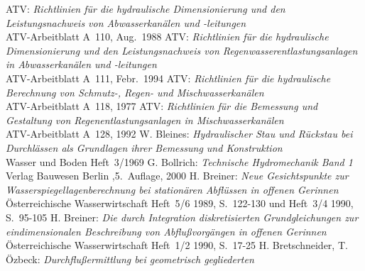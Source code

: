    \cleardoublepage
   \begin{thebibliography}{99}
                 ATV: \emph{Richtlinien f\"{u}r die hydraulische Dimensionierung und den Leistungsnachweis
                                 von  Abwasserkan\"{a}len und -leitungen}
                                 \\ ATV-Arbeitblatt A~110, Aug.~1988
                 ATV: \emph{Richtlinien f\"{u}r die hydraulische Dimensionierung und den Leistungsnachweis
                                 von Regenwasserentlastungsanlagen in Abwasserkan\"{a}len und -leitungen}
                                 \\ ATV-Arbeitblatt A~111, Febr.~1994
                 ATV: \emph{Richtlinien f\"{u}r die hydraulische Berechnung von Schmutz-, Regen- und
                                 Mischwasserkan\"{a}len}
                                 \\ ATV-Arbeitblatt A~118, 1977
                 ATV: \emph{Richtlinien f\"{u}r die Bemessung und Gestaltung von Regenentlastungsanlagen in
                                 Mischwasserkan\"{a}len}
                                 \\ ATV-Arbeitblatt A~128, 1992
                W. Bleines: \emph{Hydraulischer Stau und R\"{u}ckstau bei Durchl\"{a}ssen als Grundlagen ihrer
                                 Bemessung und Konstruktion}
                                 \\ Wasser und Boden Heft~3/1969
               G. Bollrich: \emph{Technische Hydromechanik Band 1}
                                 \\ Verlag Bauwesen Berlin ,5.~Auflage, 2000
               H. Breiner: \emph{Neue Gesichtspunkte zur Wasserspiegellagenberechnung bei station\"{a}ren
                                 Abfl\"{u}ssen in offenen Gerinnen}
                                 \\ \"{O}sterreichische Wasserwirtschaft Heft~5/6 1989, S.~122-130 und Heft~3/4 1990, S.~95-105
               H. Breiner: \emph{Die durch Integration diskretisierten Grundgleichungen zur
                                 eindimensionalen Beschreibung von Abflu{\ss}vorg\"{a}ngen in offenen Gerinnen}
                                 \\ \"{O}sterreichische Wasserwirtschaft Heft~1/2 1990, S.~17-25
        H. Bretschneider, T. \"{O}zbeck: \emph{Durchflu{\ss}ermittlung bei geometrisch gegliederten
}
\end{thebibliography}
